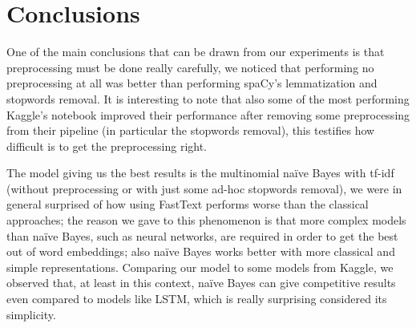 \section*{Conclusions}
One of the main conclusions that can be drawn from our experiments is that preprocessing must be done really carefully, we noticed that performing no preprocessing at all was better than performing spaCy's lemmatization and stopwords removal. 
It is interesting to note that also some of the most performing Kaggle's notebook improved their performance after removing some preprocessing from their pipeline (in particular the stopwords removal), this testifies how difficult is to get the preprocessing right.

The model giving us the best results is the multinomial na\"ive Bayes with tf-idf (without preprocessing or with just some ad-hoc stopwords removal), we were in general surprised of how using FastText performs worse than the classical approaches; the reason we gave to this phenomenon is that  more complex models than na\"ive Bayes, such as neural networks, are required in order to get the best out of word embeddings; also na\"ive Bayes works better with more classical and simple representations. 
Comparing our model to some models from Kaggle, we observed that, at least in this context, na\"ive Bayes can give competitive results even compared to models like LSTM, which is really surprising considered its simplicity.

